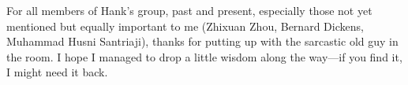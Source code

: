 For all members of Hank's group, past and present, especially those not yet mentioned but equally important to me (Zhixuan Zhou, Bernard Dickens, Muhammad Husni Santriaji), thanks for putting up with the sarcastic old guy in the room.
I hope I managed to drop a little wisdom along the way---if you find it, I might need it back.
